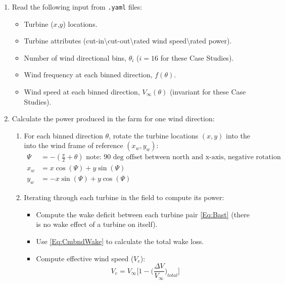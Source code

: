 \documentclass[10pt]{article}
\begin{document}
    \begin{enumerate}
        \item Read the following input from \texttt{.yaml} files:
            \begin{itemize}
                \item Turbine ($x$,$y$) locations.
                \item Turbine attributes (cut-in\textbackslash cut-out\textbackslash rated wind speed\textbackslash rated power).
                \item Number of wind directional bins, $\theta_{i}$ ($i=16$ for these Case Studies).
                \item Wind frequency at each binned direction, $f(\theta)$.
                \item Wind speed at each binned direction, $V_{\infty}(\theta)$ (invariant for these Case Studies).
            \end{itemize}
        \item Calculate the power produced in the farm for one wind direction:
            \begin{enumerate}
                \item For each binned direction $\theta$, rotate the turbine locations $(x,y)$ into the into the wind frame of reference $(x_w, y_w)$:
                \begin{align*}
                    \Psi &= -\left(\frac{\pi}{2} + \theta\right) \text{ note: 90 deg offset between north and x-axis, negative rotation}\\
                    x_w &= x\cos(\Psi) + y\sin(\Psi)\\
                    y_w &= -x\sin(\Psi) + y\cos(\Psi)
                \end{align*}
                \item Iterating through each turbine in the field to compute its power:
                    \begin{itemize}
                        \item Compute the wake deficit between each turbine pair \cref{Eq:Bast} (there is no wake effect of a turbine on itself).
                        \item Use \cref{Eq:CmbndWake} to calculate the total wake loss.
                        \item Compute effective wind speed ($V_{e}$):
                            \begin{equation*}
                                V_{e} = V_{\infty} \bigg[1 - \bigg(\frac{\Delta V}{V_{\infty}}\bigg)_{total}\bigg]

\end{equation*}
\end{itemize}
\end{enumerate}
\end{enumerate}
\end{document}
